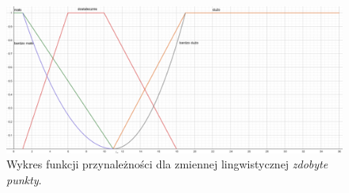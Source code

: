 \documentclass{classrep}
\begin{document}
\begin{enumerate}
    \begin{figure}[H]
        \centering
        \includegraphics[width=14cm]{wykres_punkty.png}
        \caption{Wykres funkcji przynależności dla zmiennej lingwistycznej \textit{zdobyte punkty}.}
        \label{rysunek:punkty}
    \end{figure}
    

\end{enumerate}
\end{document}
